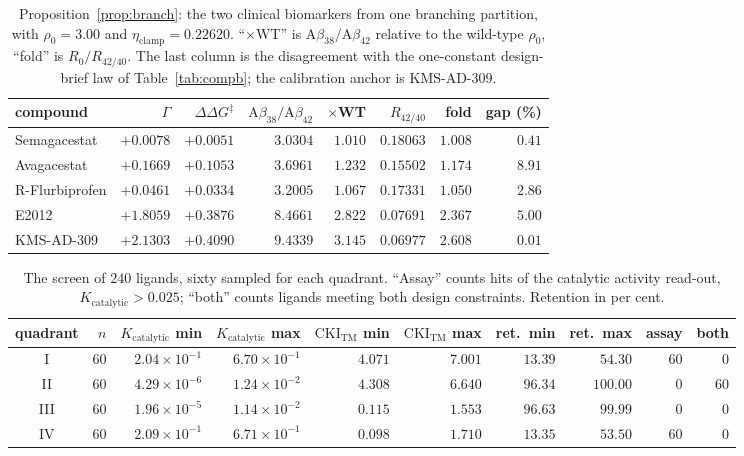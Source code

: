 \documentclass[11pt,reqno]{amsart}
\theoremstyle{plain}
\theoremstyle{definition}
\theoremstyle{remark}
\numberwithin{equation}{section}
\newcommand{\CKI}{\mathrm{CKI}}
\newcommand{\Kcat}{K_{\mathrm{catalytic}}}
\newcommand{\CKItm}{\CKI_{\mathrm{TM}}}
\newcommand{\Ab}{\mathrm{A}\beta}
\begin{document}
\begin{table}[ht]
\centering\footnotesize\setlength{\tabcolsep}{4.5pt}
\caption{Proposition~\ref{prop:branch}: the two clinical biomarkers from one branching partition, with $\rho_0=3.00$ and $\eta_{\mathrm{clamp}}=0.22620$. ``$\times$WT'' is $\Ab_{38}/\Ab_{42}$ relative to the wild-type $\rho_0$, ``fold'' is $R_0/R_{42/40}$. The last column is the disagreement with the one-constant design-brief law of Table~\ref{tab:compb}; the calibration anchor is KMS-AD-309.}
\label{tab:biomark}
\begin{tabular}{@{}l r r r r r r r@{}}
\toprule
compound & $\Gamma$ & $\Delta\Delta G^{\ddagger}$ & $\Ab_{38}/\Ab_{42}$ & $\times$WT & $R_{42/40}$ & fold & gap (\%) \\
\midrule
Semagacestat & $+0.0078$ & $+0.0051$ & $3.0304$ & $1.010$ & $0.18063$ & $1.008$ & $0.41$ \\
Avagacestat & $+0.1669$ & $+0.1053$ & $3.6961$ & $1.232$ & $0.15502$ & $1.174$ & $8.91$ \\
R-Flurbiprofen & $+0.0461$ & $+0.0334$ & $3.2005$ & $1.067$ & $0.17331$ & $1.050$ & $2.86$ \\
E2012 & $+1.8059$ & $+0.3876$ & $8.4661$ & $2.822$ & $0.07691$ & $2.367$ & $5.00$ \\
KMS-AD-309 & $+2.1303$ & $+0.4090$ & $9.4339$ & $3.145$ & $0.06977$ & $2.608$ & $0.01$ \\
\bottomrule
\end{tabular}
\end{table}

\begin{table}[ht]
\centering\footnotesize\setlength{\tabcolsep}{4pt}
\caption{The screen of $240$ ligands, sixty sampled for each quadrant. ``Assay'' counts hits of the catalytic activity read-out, $\Kcat>0.025$; ``both'' counts ligands meeting both design constraints. Retention in per cent.}
\label{tab:screen}
\begin{tabular}{@{}c r r r r r r r r r@{}}
\toprule
quadrant & $n$ & $\Kcat$ min & $\Kcat$ max & $\CKItm$ min & $\CKItm$ max & ret.\ min & ret.\ max & assay & both \\
\midrule
I & $60$ & $2.04 \times 10^{-1}$ & $6.70 \times 10^{-1}$ & $4.071$ & $7.001$ & $13.39$ & $54.30$ & $60$ & $0$ \\
II & $60$ & $4.29 \times 10^{-6}$ & $1.24 \times 10^{-2}$ & $4.308$ & $6.640$ & $96.34$ & $100.00$ & $0$ & $60$ \\
III & $60$ & $1.96 \times 10^{-5}$ & $1.14 \times 10^{-2}$ & $0.115$ & $1.553$ & $96.63$ & $99.99$ & $0$ & $0$ \\
IV & $60$ & $2.09 \times 10^{-1}$ & $6.71 \times 10^{-1}$ & $0.098$ & $1.710$ & $13.35$ & $53.50$ & $60$ & $0$ \\
\bottomrule
\end{tabular}
\end{table}
\end{document}
